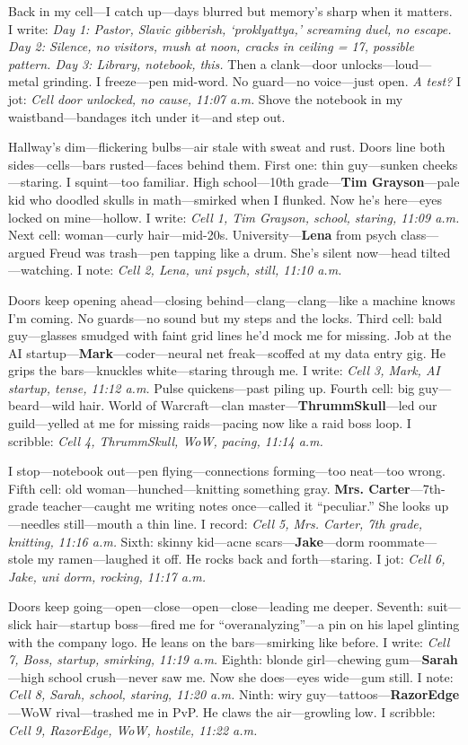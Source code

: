 \documentclass{article}
\begin{document}
Back in my cell—I catch up—days blurred but memory’s sharp when it matters. I write: \textit{Day 1: Pastor, Slavic gibberish, ‘proklyattya,’ screaming duel, no escape. Day 2: Silence, no visitors, mush at noon, cracks in ceiling = 17, possible pattern. Day 3: Library, notebook, this.} Then a clank—door unlocks—loud—metal grinding. I freeze—pen mid-word. No guard—no voice—just open. \textit{A test?} I jot: \textit{Cell door unlocked, no cause, 11:07 a.m.} Shove the notebook in my waistband—bandages itch under it—and step out.

Hallway’s dim—flickering bulbs—air stale with sweat and rust. Doors line both sides—cells—bars rusted—faces behind them. First one: thin guy—sunken cheeks—staring. I squint—too familiar. High school—10th grade—\textbf{Tim Grayson}—pale kid who doodled skulls in math—smirked when I flunked. Now he’s here—eyes locked on mine—hollow. I write: \textit{Cell 1, Tim Grayson, school, staring, 11:09 a.m.} Next cell: woman—curly hair—mid-20s. University—\textbf{Lena} from psych class—argued Freud was trash—pen tapping like a drum. She’s silent now—head tilted—watching. I note: \textit{Cell 2, Lena, uni psych, still, 11:10 a.m.}

Doors keep opening ahead—closing behind—clang—clang—like a machine knows I’m coming. No guards—no sound but my steps and the locks. Third cell: bald guy—glasses smudged with faint grid lines he’d mock me for missing. Job at the AI startup—\textbf{Mark}—coder—neural net freak—scoffed at my data entry gig. He grips the bars—knuckles white—staring through me. I write: \textit{Cell 3, Mark, AI startup, tense, 11:12 a.m.} Pulse quickens—past piling up. Fourth cell: big guy—beard—wild hair. World of Warcraft—clan master—\textbf{ThrummSkull}—led our guild—yelled at me for missing raids—pacing now like a raid boss loop. I scribble: \textit{Cell 4, ThrummSkull, WoW, pacing, 11:14 a.m.}

I stop—notebook out—pen flying—connections forming—too neat—too wrong. Fifth cell: old woman—hunched—knitting something gray. \textbf{Mrs. Carter}—7th-grade teacher—caught me writing notes once—called it “peculiar.” She looks up—needles still—mouth a thin line. I record: \textit{Cell 5, Mrs. Carter, 7th grade, knitting, 11:16 a.m.} Sixth: skinny kid—acne scars—\textbf{Jake}—dorm roommate—stole my ramen—laughed it off. He rocks back and forth—staring. I jot: \textit{Cell 6, Jake, uni dorm, rocking, 11:17 a.m.}

Doors keep going—open—close—open—close—leading me deeper. Seventh: suit—slick hair—startup boss—fired me for “overanalyzing”—a pin on his lapel glinting with the company logo. He leans on the bars—smirking like before. I write: \textit{Cell 7, Boss, startup, smirking, 11:19 a.m.} Eighth: blonde girl—chewing gum—\textbf{Sarah}—high school crush—never saw me. Now she does—eyes wide—gum still. I note: \textit{Cell 8, Sarah, school, staring, 11:20 a.m.} Ninth: wiry guy—tattoos—\textbf{RazorEdge}—WoW rival—trashed me in PvP. He claws the air—growling low. I scribble: \textit{Cell 9, RazorEdge, WoW, hostile, 11:22 a.m.}
\end{document}
